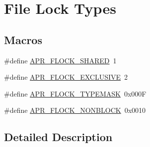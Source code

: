 \hypertarget{group__apr__file__lock__types}{\section{File Lock Types}
\label{group__apr__file__lock__types}
}
\subsection*{Macros}
\begin{DoxyCompactItemize}
\item 
\#define \hyperlink{group__apr__file__lock__types_gaba177fe81cd70b389753ad2096b2ce7c}{A\-P\-R\-\_\-\-F\-L\-O\-C\-K\-\_\-\-S\-H\-A\-R\-E\-D}~1
\item 
\#define \hyperlink{group__apr__file__lock__types_gafbf0caa093b99bdf11e25360b9099852}{A\-P\-R\-\_\-\-F\-L\-O\-C\-K\-\_\-\-E\-X\-C\-L\-U\-S\-I\-V\-E}~2
\item 
\#define \hyperlink{group__apr__file__lock__types_ga40777e364fb20bb9a9ee57e74b19c13d}{A\-P\-R\-\_\-\-F\-L\-O\-C\-K\-\_\-\-T\-Y\-P\-E\-M\-A\-S\-K}~0x000\-F
\item 
\#define \hyperlink{group__apr__file__lock__types_gab327fa0250e19006f20d5ec65fe7f22a}{A\-P\-R\-\_\-\-F\-L\-O\-C\-K\-\_\-\-N\-O\-N\-B\-L\-O\-C\-K}~0x0010
\end{DoxyCompactItemize}


\subsection{Detailed Description}


